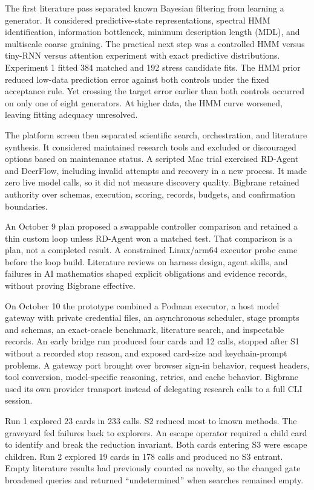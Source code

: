 The first literature pass separated known Bayesian filtering from learning a generator. It considered predictive-state representations, spectral HMM identification, information bottleneck, minimum description length (MDL), and multiscale coarse graining. The practical next step was a controlled HMM versus tiny-RNN versus attention experiment with exact predictive distributions. Experiment 1 fitted 384 matched and 192 stress candidate fits. The HMM prior reduced low-data prediction error against both controls under the fixed acceptance rule. Yet crossing the target error earlier than both controls occurred on only one of eight generators. At higher data, the HMM curve worsened, leaving fitting adequacy unresolved.

The platform screen then separated scientific search, orchestration, and literature synthesis. It considered maintained research tools and excluded or discouraged options based on maintenance status. A scripted Mac trial exercised RD-Agent and DeerFlow, including invalid attempts and recovery in a new process. It made zero live model calls, so it did not measure discovery quality. Bigbrane retained authority over schemas, execution, scoring, records, budgets, and confirmation boundaries.

An October 9 plan proposed a swappable controller comparison and retained a thin custom loop unless RD-Agent won a matched test. That comparison is a plan, not a completed result. A constrained Linux/arm64 executor probe came before the loop build. Literature reviews on harness design, agent skills, and failures in AI mathematics shaped explicit obligations and evidence records, without proving Bigbrane effective.

On October 10 the prototype combined a Podman executor, a host model gateway with private credential files, an asynchronous scheduler, stage prompts and schemas, an exact-oracle benchmark, literature search, and inspectable records. An early bridge run produced four cards and 12 calls, stopped after S1 without a recorded stop reason, and exposed card-size and keychain-prompt problems. A gateway port brought over browser sign-in behavior, request headers, tool conversion, model-specific reasoning, retries, and cache behavior. Bigbrane used its own provider transport instead of delegating research calls to a full CLI session.

Run 1 explored 23 cards in 233 calls. S2 reduced most to known methods. The graveyard fed failures back to explorers. An escape operator required a child card to identify and break the reduction invariant. Both cards entering S3 were escape children. Run 2 explored 19 cards in 178 calls and produced no S3 entrant. Empty literature results had previously counted as novelty, so the changed gate broadened queries and returned ``undetermined'' when searches remained empty.

